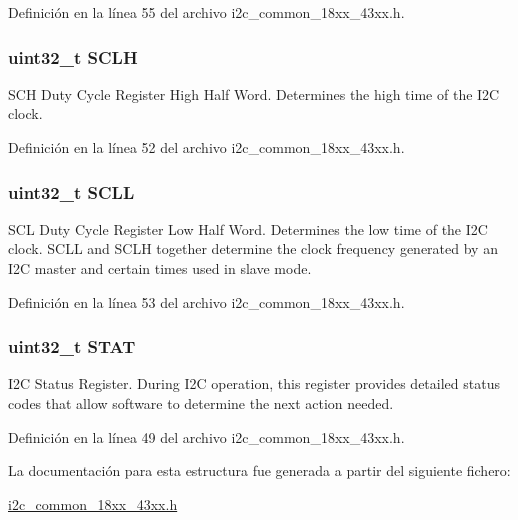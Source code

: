 Definición en la línea 55 del archivo i2c\+\_\+common\+\_\+18xx\+\_\+43xx.\+h.

\subsubsection[{\texorpdfstring{S\+C\+LH}{SCLH}}]{ uint32\+\_\+t S\+C\+LH}\hypertarget{struct_l_p_c___i2_c___t_ac1ffb2722b08c7d2ab4545500a362577}{}\label{struct_l_p_c___i2_c___t_ac1ffb2722b08c7d2ab4545500a362577}
S\+CH Duty Cycle Register High Half Word. Determines the high time of the I2C clock. 

Definición en la línea 52 del archivo i2c\+\_\+common\+\_\+18xx\+\_\+43xx.\+h.

\subsubsection[{\texorpdfstring{S\+C\+LL}{SCLL}}]{ uint32\+\_\+t S\+C\+LL}\hypertarget{struct_l_p_c___i2_c___t_aee8ea0794273366a8a6998e45ca00929}{}\label{struct_l_p_c___i2_c___t_aee8ea0794273366a8a6998e45ca00929}
S\+CL Duty Cycle Register Low Half Word. Determines the low time of the I2C clock. S\+C\+LL and S\+C\+LH together determine the clock frequency generated by an I2C master and certain times used in slave mode. 

Definición en la línea 53 del archivo i2c\+\_\+common\+\_\+18xx\+\_\+43xx.\+h.

\subsubsection[{\texorpdfstring{S\+T\+AT}{STAT}}]{ uint32\+\_\+t S\+T\+AT}\hypertarget{struct_l_p_c___i2_c___t_a9d37b00631f37ab3e4a127a7fee46da7}{}\label{struct_l_p_c___i2_c___t_a9d37b00631f37ab3e4a127a7fee46da7}
I2C Status Register. During I2C operation, this register provides detailed status codes that allow software to determine the next action needed. 

Definición en la línea 49 del archivo i2c\+\_\+common\+\_\+18xx\+\_\+43xx.\+h.



La documentación para esta estructura fue generada a partir del siguiente fichero\+:\begin{DoxyCompactItemize}
\item 
\hyperlink{i2c__common__18xx__43xx_8h}{i2c\+\_\+common\+\_\+18xx\+\_\+43xx.\+h}\end{DoxyCompactItemize}
